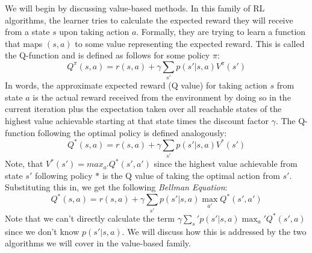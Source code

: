 \noindent We will begin by discussing value-based methods. In this family of RL algorithms, the learner tries to calculate the expected reward they will receive from a state $s$ upon taking action $a$. Formally, they are trying to learn a function that maps $(s, a)$ to some value representing the expected reward. This is called the Q-function and is defined as follows for some policy $\pi$:
\begin{equation}
    Q^{\pi}(s, a) = r(s, a) + \gamma\sum_{s'}p(s'|s, a)V^{\pi}(s')
\end{equation}
In words, the approximate expected reward (Q value) for taking action $s$ from state $a$ is the actual reward received from the environment by doing so in the current iteration plus the expectation taken over all reachable states of the highest value achievable starting at that state times the discount factor $\gamma$. The Q-function following the optimal policy is defined analogously:
\begin{equation}
    Q^{*}(s, a) = r(s, a) + \gamma\sum_{s'}p(s'|s, a)V^{*}(s')
\end{equation}
Note, that $V^*(s') = max_{a'}Q^*(s', a')$ since the highest value achievable from state $s'$ following policy $*$ is the Q value of taking the optimal action from $s'$. Substituting this in, we get the following \textit{Bellman Equation}:
\begin{equation}
    Q^*(s, a) = r(s, a) + \gamma\sum_{s'}p(s'|s, a)\max_{a'}Q^*(s', a')
\end{equation}
Note that we can't directly calculate the term $\gamma\sum_s'p(s'|s, a)\max_a'Q^*(s', a)$ since we don't know $p(s'|s, a)$. We will discuss how this is addressed by the two algorithms we will cover in the value-based family.
